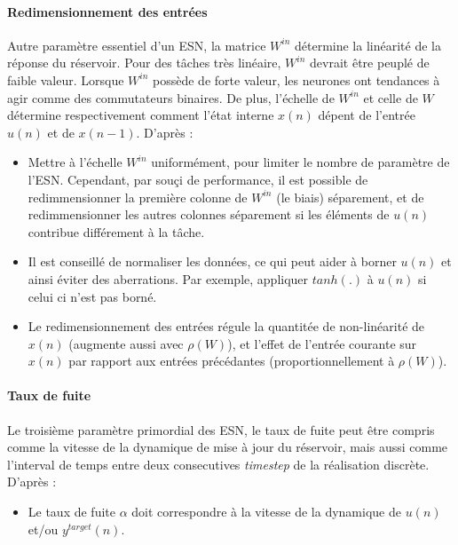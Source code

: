 \documentclass[12pt]{article}
\begin{document}
\paragraph{Redimensionnement des entrées}
Autre paramètre essentiel d'un ESN, la matrice $W^{in}$ détermine la linéarité de la réponse du réservoir. Pour des tâches très linéaire, $W^{in}$ devrait être peuplé de faible valeur. Lorsque $W^{in}$ possède de forte valeur, les neurones ont tendances à agir comme des commutateurs binaires. De plus, l'échelle de $W^{in}$ et celle de $W$ détermine respectivement comment l'état interne $x(n)$ dépent de l'entrée $u(n)$ et de $x(n-1)$.\newline
D'après \cite{Lukosevicius12}:
\begin{itemize}
\item Mettre à l'échelle $W^{in}$ uniformément, pour limiter le nombre de paramètre de l'ESN. Cependant, par souçi de performance, il est possible de redimmensionner la première colonne de $W^{in}$ (le biais) séparement, et de redimmensionner les autres colonnes séparement si les éléments de $u(n)$ contribue différement à la tâche.
\item Il est conseillé de normaliser les données, ce qui peut aider à borner $u(n)$ et ainsi éviter des aberrations. Par exemple, appliquer $tanh(.)$ à $u(n)$ si celui ci n'est pas borné.
\item Le redimensionnement des entrées régule la quantitée de non-linéarité de $x(n)$ (augmente aussi avec $\rho(W)$), et l'effet de l'entrée courante sur $x(n)$ par rapport aux entrées précédantes (proportionnellement à $\rho(W)$).
\end{itemize}

\paragraph{Taux de fuite}
Le troisième paramètre primordial des ESN, le taux de fuite peut être compris comme la vitesse de la dynamique de mise à jour du réservoir, mais aussi comme l'interval de temps entre deux consecutives \textit{timestep} de la réalisation discrète.\newline
D'après \cite{Lukosevicius12}:
\begin{itemize}
\item Le taux de fuite $\alpha$ doit correspondre à la vitesse de la dynamique de $u(n)$ et/ou $y^{target}(n)$.
\end{itemize}




\end{document}
